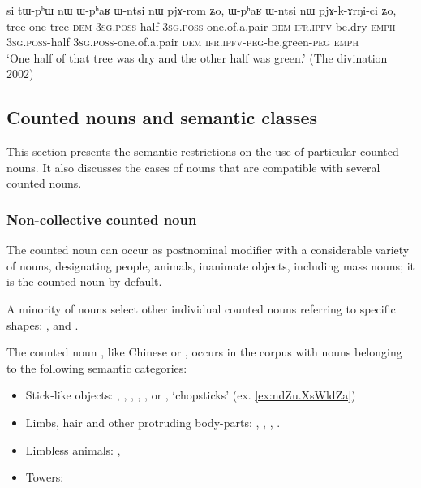 \begin{exe}
	\ex \label{ex:tWphW.nW}
	\gll si tɯ-pʰɯ nɯ ɯ-pʰaʁ ɯ-ntsi nɯ pjɤ-rom ʑo, ɯ-pʰaʁ ɯ-ntsi nɯ pjɤ-k-ɤrŋi-ci ʑo, \\
	tree one-tree \textsc{dem} \textsc{3sg}.\textsc{poss}-half \textsc{3sg}.\textsc{poss}-one.of.a.pair \textsc{dem} \textsc{ifr}.\textsc{ipfv}-be.dry \textsc{emph} \textsc{3sg}.\textsc{poss}-half \textsc{3sg}.\textsc{poss}-one.of.a.pair \textsc{dem} \textsc{ifr}.\textsc{ipfv}-\textsc{peg}-be.green-\textsc{peg} \textsc{emph} \\
	\glt `One half of that tree was dry and the other half was green.' (The divination 2002)
\end{exe}


\subsection{Counted nouns and semantic classes} \label{sec:CN.classification}

This section presents the semantic restrictions on the use of particular counted nouns. It also discusses the cases of nouns that are compatible with several counted nouns.

\subsubsection{Non-collective counted noun}
The counted noun  can occur as postnominal modifier with a considerable variety of nouns, designating people, animals, inanimate objects, including mass nouns; it is the counted noun by default.

A minority of nouns select other individual counted nouns referring to specific shapes: ,  and .

 
The counted noun , like Chinese  or , occurs in the corpus with nouns belonging to the following semantic categories:

\begin{itemize}
\item Stick-like objects:  , , , ,  ,  or , `chopsticks' (ex. \ref{ex:ndZu.XsWldZa})
\item Limbs, hair and other protruding body-parts: , ,  , .
\item Limbless animals:  ,  
\item Towers: 
\end{itemize} 

